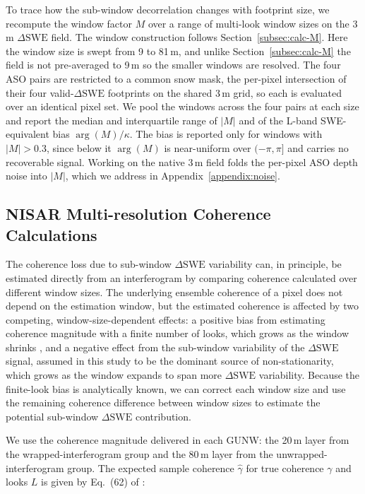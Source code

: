 \documentclass[tc, manuscript]{copernicus}
\begin{document}
To trace how the sub-window decorrelation changes with footprint size, we recompute the window factor $M$ over a range of multi-look window sizes on the 3\,\unit{m} $\Delta\mathrm{SWE}$ field. The window construction follows Section~\ref{subsec:calc-M}. Here the window size is swept from 9 to 81\,\unit{m}, and unlike Section~\ref{subsec:calc-M} the field is not pre-averaged to 9\,\unit{m} so the smaller windows are resolved. The four ASO pairs are restricted to a common snow mask, the per-pixel intersection of their four valid-$\Delta\mathrm{SWE}$ footprints on the shared 3\,\unit{m} grid, so each is evaluated over an identical pixel set. We pool the windows across the four pairs at each size and report the median and interquartile range of $|M|$ and of the L-band SWE-equivalent bias $\arg(M)/\kappa$. The bias is reported only for windows with $|M|>0.3$, since below it $\arg(M)$ is near-uniform over $(-\pi,\pi]$ and carries no recoverable signal. Working on the native 3\,\unit{m} field folds the per-pixel ASO depth noise into $|M|$, which we address in Appendix~\ref{appendix:noise}.

\subsection{NISAR Multi-resolution Coherence Calculations}\label{subsec:nisar-coherence-calc}

The coherence loss due to sub-window $\Delta\mathrm{SWE}$ variability can, in principle, be estimated directly from an interferogram by comparing coherence calculated over different window sizes. The underlying ensemble coherence of a pixel does not depend on the estimation window, but the estimated coherence is affected by two competing, window-size-dependent effects: a positive bias from estimating coherence magnitude with a finite number of looks, which grows as the window shrinks \citep{Bamler1998}, and a negative effect from the sub-window variability of the $\Delta\mathrm{SWE}$ signal, assumed in this study to be the dominant source of non-stationarity, which grows as the window expands to span more $\Delta\mathrm{SWE}$ variability. Because the finite-look bias is analytically known, we can correct each window size and use the remaining coherence difference between window sizes to estimate the potential sub-window $\Delta\mathrm{SWE}$ contribution.

We use the coherence magnitude delivered in each GUNW: the 20\,\unit{m} layer from the wrapped-interferogram group and the 80\,\unit{m} layer from the unwrapped-interferogram group. The expected sample coherence $\hat{\gamma}$ for true coherence $\gamma$ and looks $L$ is given by Eq.~(62) of \citet{Bamler1998}:
\end{document}
